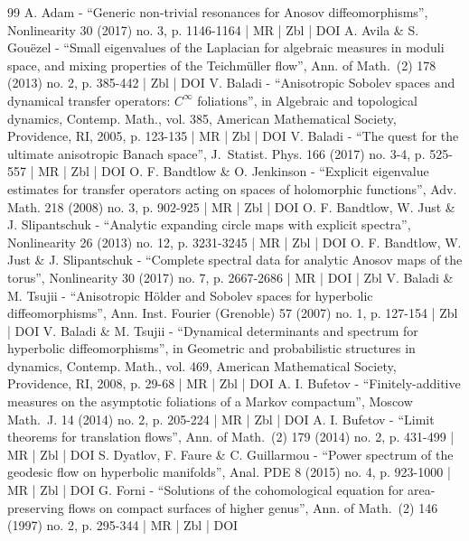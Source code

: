 \begin{thebibliography}{99}
A. Adam - “Generic non-trivial resonances for Anosov diffeomorphisms”, Nonlinearity 30 (2017) no. 3, p. 1146-1164 | MR | Zbl | DOI
A. Avila \& S. Gouëzel - “Small eigenvalues of the Laplacian for algebraic measures in moduli space, and mixing properties of the Teichmüller flow”, Ann. of Math. (2) 178 (2013) no. 2, p. 385-442 | Zbl | DOI
V. Baladi - “Anisotropic Sobolev spaces and dynamical transfer operators: $C^\infty $ foliations”, in Algebraic and topological dynamics, Contemp. Math., vol. 385, American Mathematical Society, Providence, RI, 2005, p. 123-135 | MR | Zbl | DOI
V. Baladi - “The quest for the ultimate anisotropic Banach space”, J. Statist. Phys. 166 (2017) no. 3-4, p. 525-557 | MR | Zbl | DOI
O. F. Bandtlow \& O. Jenkinson - “Explicit eigenvalue estimates for transfer operators acting on spaces of holomorphic functions”, Adv. Math. 218 (2008) no. 3, p. 902-925 | MR | Zbl | DOI
O. F. Bandtlow, W. Just \& J. Slipantschuk - “Analytic expanding circle maps with explicit spectra”, Nonlinearity 26 (2013) no. 12, p. 3231-3245 | MR | Zbl | DOI
O. F. Bandtlow, W. Just \& J. Slipantschuk - “Complete spectral data for analytic Anosov maps of the torus”, Nonlinearity 30 (2017) no. 7, p. 2667-2686 | MR | DOI | Zbl
V. Baladi \& M. Tsujii - “Anisotropic Hölder and Sobolev spaces for hyperbolic diffeomorphisms”, Ann. Inst. Fourier (Grenoble) 57 (2007) no. 1, p. 127-154 | Zbl | DOI
V. Baladi \& M. Tsujii - “Dynamical determinants and spectrum for hyperbolic diffeomorphisms”, in Geometric and probabilistic structures in dynamics, Contemp. Math., vol. 469, American Mathematical Society, Providence, RI, 2008, p. 29-68 | MR | Zbl | DOI
A. I. Bufetov - “Finitely-additive measures on the asymptotic foliations of a Markov compactum”, Moscow Math. J. 14 (2014) no. 2, p. 205-224 | MR | Zbl | DOI
A. I. Bufetov - “Limit theorems for translation flows”, Ann. of Math. (2) 179 (2014) no. 2, p. 431-499 | MR | Zbl | DOI
S. Dyatlov, F. Faure \& C. Guillarmou - “Power spectrum of the geodesic flow on hyperbolic manifolds”, Anal. PDE 8 (2015) no. 4, p. 923-1000 | MR | Zbl | DOI
G. Forni - “Solutions of the cohomological equation for area-preserving flows on compact surfaces of higher genus”, Ann. of Math. (2) 146 (1997) no. 2, p. 295-344 | MR | Zbl | DOI

\end{thebibliography}
